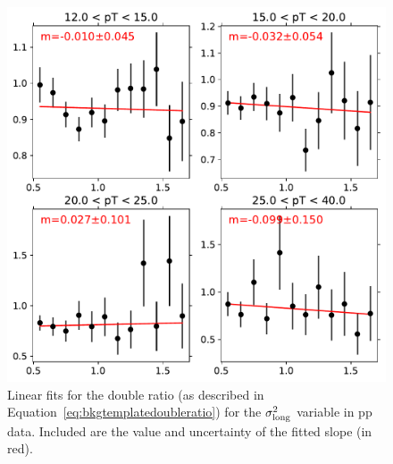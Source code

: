 \begin{figure}
    \centering
    \includegraphics[width=\textwidth]{Purity/single-linear-fits-pp}
    \caption{Linear fits for the double ratio (as described in Equation~\ref{eq:bkgtemplatedoubleratio}) for the $\sigma^{2}_{\mathrm{long}}$ variable in pp data.  Included are the value and uncertainty of the fitted slope (in red).}
    \label{fig:bkgtemplatedoubleratiofits_pp}
\end{figure}


